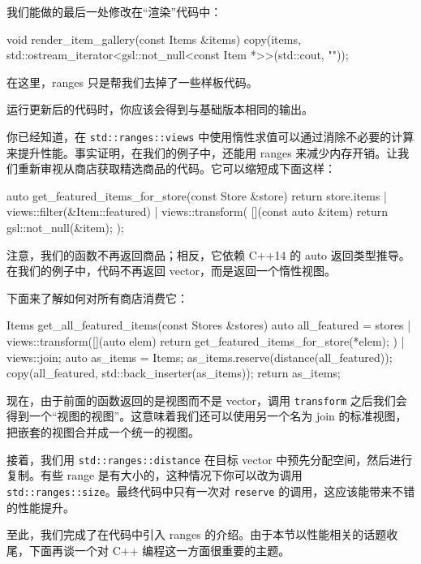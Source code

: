 我们能做的最后一处修改在“渲染”代码中：

\begin{codebox}[cpp]
void render_item_gallery(const Items &items) {
    copy(items, std::ostream_iterator<gsl::not_null<const Item *>>(std::cout, "\n"));
}
\end{codebox}

在这里，ranges 只是帮我们去掉了一些样板代码。

运行更新后的代码时，你应该会得到与基础版本相同的输出。

\label{idx:498}
你已经知道，在 \texttt{std::\allowbreak{}ranges::\allowbreak{}views} 中使用惰性求值可以通过消除不必要的计算来提升性能。事实证明，在我们的例子中，还能用 ranges 来减少内存开销。让我们重新审视从商店获取精选商品的代码。它可以缩短成下面这样：

\begin{codebox}[text]
auto get_featured_items_for_store(const Store &store) {
    return store.items | views::filter(&Item::featured) | views::transform(
             [](const auto &item) { return gsl::not_null(&item); });
}
\end{codebox}

注意，我们的函数不再返回商品；相反，它依赖 C++14 的 auto 返回类型推导。在我们的例子中，代码不再返回 vector，而是返回一个惰性视图。

下面来了解如何对所有商店消费它：

\begin{codebox}[cpp]
Items get_all_featured_items(const Stores &stores) {
    auto all_featured = stores | views::transform([](auto elem) {
                            return get_featured_items_for_store(*elem);
                        }) |
                        views::join;
    auto as_items = Items{};
    as_items.reserve(distance(all_featured));
    copy(all_featured, std::back_inserter(as_items));
    return as_items;
}
\end{codebox}

现在，由于前面的函数返回的是视图而不是 vector，调用 \texttt{transform} 之后我们会得到一个“视图的视图”。这意味着我们还可以使用另一个名为 join 的标准视图，把嵌套的视图合并成一个统一的视图。

接着，我们用 \texttt{std::\allowbreak{}ranges::\allowbreak{}distance} 在目标 vector 中预先分配空间，然后进行复制。有些 range 是有大小的，这种情况下你可以改为调用 \texttt{std::\allowbreak{}ranges::\allowbreak{}size}。最终代码中只有一次对 \texttt{reserve} 的调用，这应该能带来不错的性能提升。

\label{idx:499}
至此，我们完成了在代码中引入 ranges 的介绍。由于本节以性能相关的话题收尾，下面再谈一个对 C++ 编程这一方面很重要的主题。

